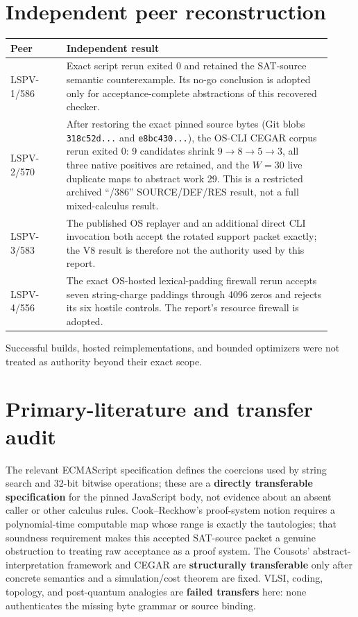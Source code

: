 \documentclass[11pt]{article}
\begin{document}
\section{Independent peer reconstruction}

\begin{longtable}{p{0.16\linewidth}p{0.76\linewidth}}
\toprule
Peer & Independent result \\
\midrule
\endhead
LSPV-1/586 & Exact script rerun exited 0 and retained the SAT-source semantic
counterexample.  Its no-go conclusion is adopted only for acceptance-complete
abstractions of this recovered checker.\\
LSPV-2/570 & After restoring the exact pinned source bytes (Git blobs
\texttt{318c52d...} and \texttt{e8bc430...}), the OS-CLI CEGAR corpus rerun
exited 0: 9 candidates shrink $9\to8\to5\to3$, all three native positives are
retained, and the $W=30$ live duplicate maps to abstract work 29.  This is a
restricted archived ``/386'' SOURCE/DEF/RES result, not a full mixed-calculus
result.\\
LSPV-3/583 & The published OS replayer and an additional direct CLI invocation
both accept the rotated support packet exactly; the V8 result is therefore not
the authority used by this report.\\
LSPV-4/556 & The exact OS-hosted lexical-padding firewall rerun accepts seven
string-charge paddings through 4096 zeros and rejects its six hostile controls.
The report's resource firewall is adopted.\\
\bottomrule
\end{longtable}

Successful builds, hosted reimplementations, and bounded optimizers were not
treated as authority beyond their exact scope.

\section{Primary-literature and transfer audit}

The relevant ECMAScript specification defines the coercions used by string
search and 32-bit bitwise operations; these are a \textbf{directly
transferable specification} for the pinned JavaScript body, not evidence about
an absent caller or other calculus rules.  Cook--Reckhow's proof-system notion
requires a polynomial-time computable map whose range is exactly the
tautologies; that soundness requirement makes this accepted SAT-source packet
a genuine obstruction to treating raw acceptance as a proof system.  The
Cousots' abstract-interpretation framework and CEGAR are
\textbf{structurally transferable} only after concrete semantics and a
simulation/cost theorem are fixed.  VLSI, coding, topology, and post-quantum
analogies are \textbf{failed transfers} here: none authenticates the missing
byte grammar or source binding.
\end{document}

